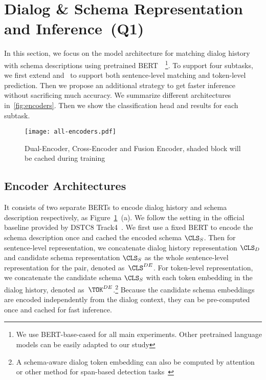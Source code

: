 \section{Dialog \& Schema Representation and Inference~(Q1)}
\label{sec:sgd:models}
In this section, we focus on the model architecture for matching
dialog history with schema descriptions using pretrained
BERT~\cite{devlin2019bert}~\footnote{We use BERT-base-cased for all
  main experiments. Other pretrained language models can be easily adapted to our study}. To support four subtasks,
we first extend \DE and \CE~to support both sentence-level matching and token-level
prediction. Then we propose an additional \FE strategy to get faster
inference without sacrificing much accuracy. We summarize different
architectures in~\autoref{fig:encoders}. Then we show the
classification head and results for each subtask.

\begin{figure}[!t]
\centering
  \texttt{[image: all-encoders.pdf]}
  \caption{\label{fig:encoders} Dual-Encoder, Cross-Encoder and Fusion Encoder, shaded block will be cached during training}
\end{figure}

\subsection{Encoder Architectures}
\label{ssec:encoder-arch}
 It consists of two separate BERTs to encode
dialog history and schema description respectively, as
Figure~\ref{fig:encoders}~(a). We follow the setting in the official
baseline provided by DSTC8 Track4~\cite{rastogi2020schema}. We first
use a fixed BERT to encode the schema description once and cached the
encoded schema $\CLS_{S}$. Then for sentence-level representation, we
concatenate dialog history representation $\CLS_{D}$ and candidate
schema representation $\CLS_{S}$ as the whole sentence-level
representation for the pair, denoted as~${\CLS^{DE}}$.  For
token-level representation, we concatenate the candidate schema
$\CLS_{S}$ with each token embedding in the dialog history, denoted
as~${\TOK^{DE}}$.\footnote{A schema-aware dialog token embedding can
  also be computed by attention or other method for span-based
  detection tasks~\cite{humeau2019poly, noroozi2020fast}} Because
the candidate schema embeddings are encoded independently from the
dialog context, they can be pre-computed once and cached for fast
inference.

